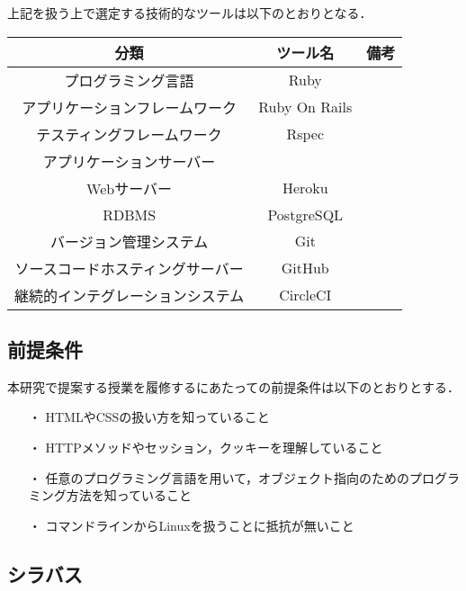 上記を扱う上で選定する技術的なツールは以下のとおりとなる．

\begin{table}[ht]
  \begin{center}
    \begin{tabular}{|c|c|c|}
      \hline
      分類 & ツール名 & 備考 \\
      \hline
      プログラミング言語 & Ruby & \\
      \hline
      アプリケーションフレームワーク & Ruby On Rails & \\
      \hline
      テスティングフレームワーク & Rspec & \\
      \hline
      アプリケーションサーバー &  & \\
      \cline{1-1}\cline{3-3}
      Webサーバー & Heroku & \\
      \hline
      RDBMS & PostgreSQL & \\
      \hline
      バージョン管理システム & Git & \\
      \hline
      ソースコードホスティングサーバー & GitHub & \\
      \hline
      継続的インテグレーションシステム & CircleCI & \\
      \hline
    \end{tabular}
  \end{center}
\end{table}

\subsection{前提条件}

本研究で提案する授業を履修するにあたっての前提条件は以下のとおりとする．

\begin{itemize}
  \item[・] HTMLやCSSの扱い方を知っていること
  \item[・] HTTPメソッドやセッション，クッキーを理解していること
  \item[・] 任意のプログラミング言語を用いて，オブジェクト指向のためのプログラミング方法を知っていること
  \item[・] コマンドラインからLinuxを扱うことに抵抗が無いこと
\end{itemize}

\subsection{シラバス}

